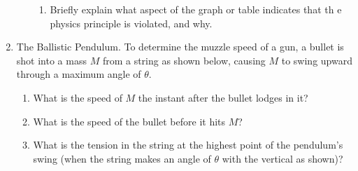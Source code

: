 \documentclass{../../../oss-apphys}
\begin{document}
\begin{enumerate}[leftmargin=15pt]
\begin{enumerate}[leftmargin=18pt,noitemsep]
\begin{enumerate}[leftmargin=18pt,noitemsep]
    \item Briefly explain what aspect of the graph or table indicates that th
      e physics principle is violated, and why.
    \end{enumerate}
  \end{enumerate}
  \newpage
  
\item The Ballistic Pendulum. To determine the muzzle speed of a gun, a bullet
  is shot into a mass $M$ from a string as shown below, causing $M$ to swing
  upward through a maximum angle of $\theta$.
  \begin{center}
  \end{center}
  \begin{enumerate}[noitemsep]
  \item What is the speed of $M$ the instant after the bullet lodges in it?
    \vspace{1.25in}
  \item What is the speed of the bullet before it hits $M$?
    \vspace{1.25in}
  \item What is the tension in the string at the highest point of the pendulum's
    swing (when the string makes an angle of $\theta$ with the vertical as
    shown)?
  \end{enumerate}
  \newpage
  

\end{enumerate}
\end{document}
